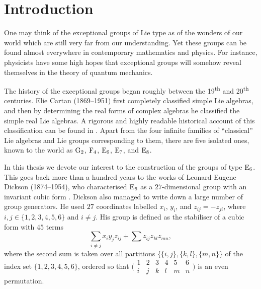 \chapter*{Introduction}

\ifpdf
    \graphicspath{{Introduction/IntroductionFigs/PNG/}{Introduction/IntroductionFigs/PDF/}{Introduction/IntroductionFigs/}}
\else
    \graphicspath{{Introduction/IntroductionFigs/EPS/}{Introduction/IntroductionFigs/}}
\fi
\label{Intro}

One may think of the exceptional groups of Lie type 
as of the wonders of our
world which are still very far from our understanding. Yet these
groups can be found almost everywhere in contemporary mathematics
and physics. For instance, physicists have some high hopes that
exceptional groups will somehow reveal themselves in the theory
of quantum mechanics. 

The history of the exceptional groups began roughly between
the 19\textsuperscript{th} and 
20\textsuperscript{th} centuries. Elie Cartan (1869--1951)
first completely classified simple Lie algebras, and then by 
determining the real forms of complex algebras he classified the
simple real Lie algebras. A rigorous and highly readable historical
account of this classification can be found in 
\cite{HawkinsThomas}. Apart from the four infinite families
of ``classical'' Lie algebras and Lie groups corresponding to
them, there are five isolated ones, known to the world as
$\mathrm{G}_2$, $\mathrm{F}_4$, $\mathrm{E}_6$, $\mathrm{E}_7$, and $\mathrm{E}_8$.

In this thesis we devote our interest to the construction of the
groups of type $\mathrm{E}_6$. This goes back more than a hundred years
to the works of Leonard Eugene Dickson (1874--1954),
who characterised $\mathrm{E}_6$ as a $27$-dimensional group with an
invariant cubic form \cite{Dickson1, Dickson2}. 
Dickson also managed to write down a 
large number of group generators. He used $27$ coordinates
labelled $x_i$, $y_i$, and $z_{ij} = -z_{ji}$, where 
$i,j \in \{1,2,3,4,5,6\}$ and $i \neq j$. His group is defined
as the stabiliser of a cubic form with $45$ terms
\begin{equation}
	\sum\limits_{i \neq j} x_i y_j z_{ij} + 
	\sum z_{ij} z_{kl} z_{mn},
\end{equation}
where the second sum is taken over all partitions 
$\{\{i, j\}, \{k, l\}, \{m, n\}\}$ of 
the index set
\mbox{$\{1,2,3,4,5,6\}$}, ordered so that $\bigl(\begin{smallmatrix}
  1 & 2 & 3 & 4 & 5 & 6 \\
  i & j & k & l & m & n
\end{smallmatrix}\bigr)$ is 
an even permutation.


